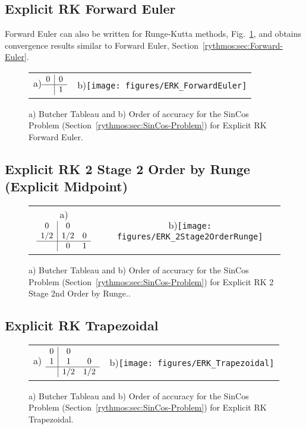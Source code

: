 \subsection{Explicit RK Forward Euler}

Forward Euler can also be written for Runge-Kutta methods, Fig.~\ref{rythmos:fig:ERK-ForwardEuler},
and obtains convergence results similar to Forward Euler, Section~\ref{rythmos:sec:Forward-Euler}.
\begin{figure}[H]
\centering{}%
\begin{tabular}{cc}
a)$\begin{array}{c|c}
0 & 0\\
\hline  & 1
\end{array}$ & b)\texttt{[image: figures/ERK\_ForwardEuler]}\tabularnewline
\end{tabular}\caption{a) Butcher Tableau and b) Order of accuracy for the SinCos Problem
(Section~\ref{rythmos:sec:SinCos-Problem}) for Explicit RK Forward
Euler.\label{rythmos:fig:ERK-ForwardEuler}}
\end{figure}


\subsection{Explicit RK 2 Stage 2 Order by Runge (Explicit Midpoint)}

\begin{figure}[H]
\centering{}%
\begin{tabular}{cc}
a) $\begin{array}{c|cc}
0 & 0\\
1/2 & 1/2 & 0\\
\hline  & 0 & 1
\end{array}$ & b)\texttt{[image: figures/ERK\_2Stage2OrderRunge]}\tabularnewline
\end{tabular}\caption{a) Butcher Tableau and b) Order of accuracy for the SinCos Problem
(Section~\ref{rythmos:sec:SinCos-Problem}) for Explicit RK 2 Stage
2nd Order by Runge.\label{rythmos:tab:ButcherTableau-ERK_2Stage2OrderRunge}.}
\end{figure}


\subsection{Explicit RK Trapezoidal}

\begin{figure}[H]
\centering{}%
\begin{tabular}{cc}
a) $\begin{array}{c|cc}
0 & 0\\
1 & 1 & 0\\
\hline  & 1/2 & 1/2
\end{array}$ & b)\texttt{[image: figures/ERK\_Trapezoidal]}\tabularnewline
\end{tabular}\caption{a) Butcher Tableau and b) Order of accuracy for the SinCos Problem
(Section~\ref{rythmos:sec:SinCos-Problem}) for Explicit RK Trapezoidal.\label{rythmos:tab:ButcherTableau-ERK_Trapezoidal}}
\end{figure}


